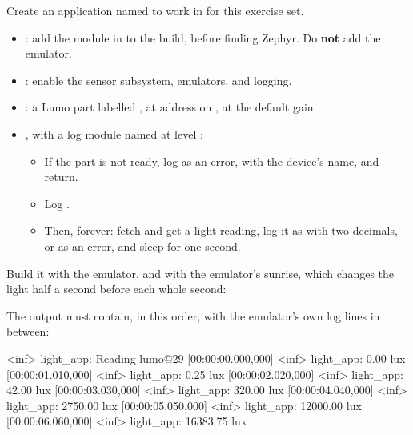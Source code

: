 \label{c5:set:4}
Create an application named  to work in for this exercise set.

\label{c5:ex:4.1}

\begin{itemize}
  \item {}: add the module in  to the build, before finding Zephyr. Do
    \textbf{not} add the emulator.
  \item {}: enable the sensor subsystem, emulators, and logging.
  \item {}: a Lumo part labelled , at address  on , at the default gain.
  \item {}, with a log module named  at level :
\begin{itemize}
  \item If the part is not ready, log  as an error, with the device’s name, and
    return.
  \item Log .
  \item Then, forever: fetch and get a light reading, log it as  with two decimals, or
     as an error, and sleep for one second.
\end{itemize}
\end{itemize}

Build it with the emulator, and with the emulator’s sunrise, which changes the light half a second
before each whole second:


\noindent The output must contain, in this order, with the emulator’s own log lines in between:

\begin{console}
[00:00:00.000,000] <inf> light_app: Reading lumo@29
[00:00:00.000,000] <inf> light_app: 0.00 lux
[00:00:01.010,000] <inf> light_app: 0.25 lux
[00:00:02.020,000] <inf> light_app: 42.00 lux
[00:00:03.030,000] <inf> light_app: 320.00 lux
[00:00:04.040,000] <inf> light_app: 2750.00 lux
[00:00:05.050,000] <inf> light_app: 12000.00 lux
[00:00:06.060,000] <inf> light_app: 16383.75 lux
\end{console}

